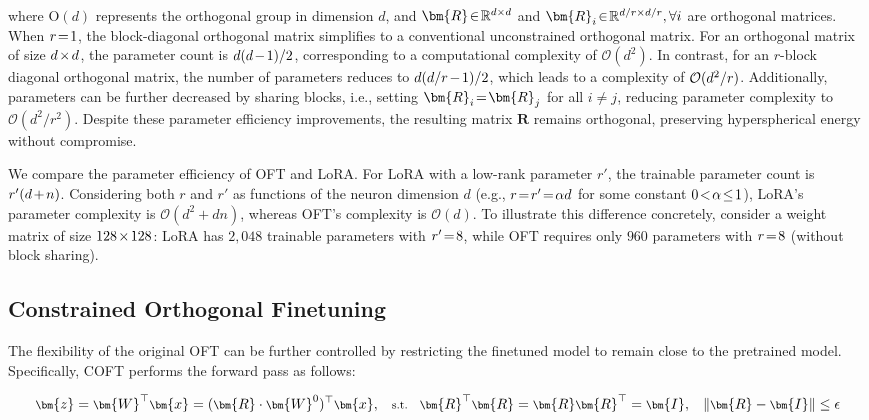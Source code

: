 where $\text{O}(d)$ represents the orthogonal group in dimension $d$, and $\thickmuskip=2mu \medmuskip=2mu \bm{R}\in\mathbb{R}^{d\times d}$ and $\thickmuskip=2mu \medmuskip=2mu \bm{R}_i\in\mathbb{R}^{d/r\times d/r},\forall i$ are orthogonal matrices. When $\thickmuskip=2mu \medmuskip=2mu r=1$, the block-diagonal orthogonal matrix simplifies to a conventional unconstrained orthogonal matrix. For an orthogonal matrix of size $\thickmuskip=2mu \medmuskip=2mu d\times d$, the parameter count is $\thickmuskip=2mu \medmuskip=2mu d(d-1)/2$, corresponding to a computational complexity of $\mathcal{O}(d^2)$. In contrast, for an $r$-block diagonal orthogonal matrix, the number of parameters reduces to $\thickmuskip=2mu \medmuskip=2mu d(d/r-1)/2$, which leads to a complexity of $\thickmuskip=2mu \medmuskip=2mu \mathcal{O}(d^2/r)$. Additionally, parameters can be further decreased by sharing blocks, i.e., setting $\thickmuskip=2mu \medmuskip=2mu \bm{R}_i=\bm{R}_j$ for all $i \neq j$, reducing parameter complexity to $\mathcal{O}(d^2/r^2)$. Despite these parameter efficiency improvements, the resulting matrix $\bm{R}$ remains orthogonal, preserving hyperspherical energy without compromise.

We compare the parameter efficiency of OFT and LoRA. For LoRA with a low-rank parameter $r'$, the trainable parameter count is $\thickmuskip=2mu \medmuskip=2mu r'(d+n)$. Considering both $r$ and $r'$ as functions of the neuron dimension $d$ (e.g., $\thickmuskip=2mu \medmuskip=2mu r=r'=\alpha d$ for some constant $\thickmuskip=2mu \medmuskip=2mu 0<\alpha\leq 1$), LoRA’s parameter complexity is $\mathcal{O}(d^2 + dn)$, whereas OFT’s complexity is $\mathcal{O}(d)$. To illustrate this difference concretely, consider a weight matrix of size $\thickmuskip=2mu \medmuskip=2mu 128\times128$: LoRA has $2,048$ trainable parameters with $\thickmuskip=2mu \medmuskip=2mu r' = 8$, while OFT requires only $960$ parameters with $\thickmuskip=2mu \medmuskip=2mu r = 8$ (without block sharing).

\subsection{Constrained Orthogonal Finetuning}

The flexibility of the original OFT can be further controlled by restricting the finetuned model to remain close to the pretrained model. Specifically, COFT performs the forward pass as follows:

\begin{equation}\label{eq:coft_general}
    \footnotesize
    \bm{z} = \bm{W}^\top \bm{x} = (\bm{R} \cdot \bm{W}^0)^\top \bm{x}, \quad \text{s.t.} \quad \bm{R}^\top \bm{R} = \bm{R} \bm{R}^\top = \bm{I}, \quad \| \bm{R} - \bm{I} \| \leq \epsilon
\end{equation}

